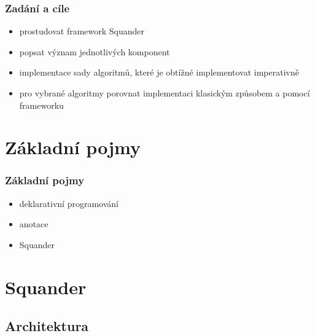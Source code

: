 \documentclass[czech]{beamer}
\begin{document}
\begin{frame}
  \frametitle{Zadání a cíle}

  \begin{itemize}
  \item<1-> prostudovat framework Squander
  \item<2-> popsat význam jednotlivých komponent
  \item<3-> implementace sady algoritmů, které je obtížné implementovat
  imperativně
  \item<4-> pro vybrané algoritmy porovnat implementaci klasickým způsobem a
  pomocí frameworku
  \end{itemize}
\end{frame}


\section{Základní pojmy}

\begin{frame}
  \frametitle{Základní pojmy}   %
  \begin{itemize}
  \item<1-> deklarativní programování
  \item<2-> anotace
  \item<3-> Squander
  \end{itemize}
  
\end{frame}



\section{Squander}

\subsection{Architektura}
\end{document}
